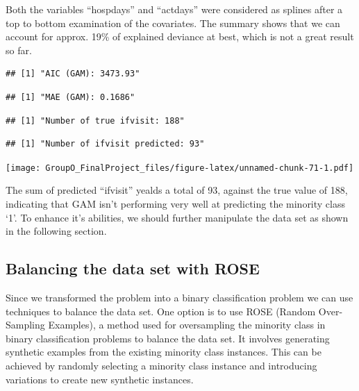 \documentclass[
]{article}
\newenvironment{Shaded}{\begin{snugshade}}{\end{snugshade}}
\newcommand{\AttributeTok}[1]{\textcolor[rgb]{0.13,0.29,0.53}{#1}}
\newcommand{\DecValTok}[1]{\textcolor[rgb]{0.00,0.00,0.81}{#1}}
\newcommand{\FunctionTok}[1]{\textcolor[rgb]{0.13,0.29,0.53}{\textbf{#1}}}
\newcommand{\NormalTok}[1]{#1}
\newcommand{\OtherTok}[1]{\textcolor[rgb]{0.56,0.35,0.01}{#1}}
\newcommand{\SpecialCharTok}[1]{\textcolor[rgb]{0.81,0.36,0.00}{\textbf{#1}}}
\begin{document}
Both the variables ``hospdays'' and ``actdays'' were considered as
splines after a top to bottom examination of the covariates. The summary
shows that we can account for approx. 19\% of explained deviance at
best, which is not a great result so far.

\begin{verbatim}
## [1] "AIC (GAM): 3473.93"
\end{verbatim}

\begin{verbatim}
## [1] "MAE (GAM): 0.1686"
\end{verbatim}

\begin{verbatim}
## [1] "Number of true ifvisit: 188"
\end{verbatim}

\begin{verbatim}
## [1] "Number of ifvisit predicted: 93"
\end{verbatim}

\texttt{[image: GroupO\_FinalProject\_files/figure-latex/unnamed-chunk-71-1.pdf]}

The sum of predicted ``ifvisit'' yealds a total of 93, against the true
value of 188, indicating that GAM isn't performing very well at
predicting the minority class `1'. To enhance it's abilities, we should
further manipulate the data set as shown in the following section.

\subsection{Balancing the data set with
ROSE}\label{balancing-the-data-set-with-rose}

Since we transformed the problem into a binary classification problem we
can use techniques to balance the data set. One option is to use ROSE
(Random Over-Sampling Examples), a method used for oversampling the
minority class in binary classification problems to balance the data
set. It involves generating synthetic examples from the existing
minority class instances. This can be achieved by randomly selecting a
minority class instance and introducing variations to create new
synthetic instances.

\begin{Shaded}
\end{Shaded}
\end{document}
